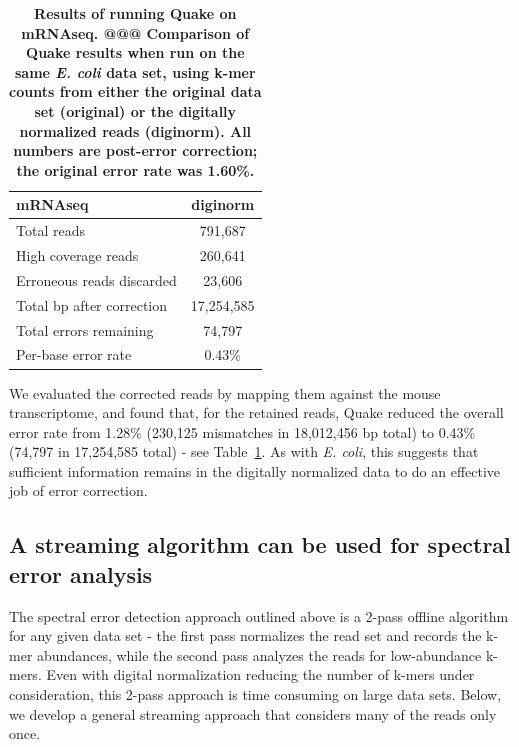 \documentclass{article}
\begin{document}
\begin{table}
\begin{tabular}{|l|c|}
\hline
{\bf mRNAseq}                    & diginorm \\
\hline
Total reads                      & 791,687 \\
High coverage reads              & 260,641 \\
Erroneous reads discarded        & 23,606 \\
Total bp after correction        & 17,254,585 \\
Total errors remaining           & 74,797 \\
Per-base error rate              & 0.43\% \\
\hline
\end{tabular}

\caption{{\bf Results of running Quake on mRNAseq. @@@ Comparison of Quake results when run on the same {\em
      E. coli} data set, using k-mer counts from either the original
    data set (original) or the digitally normalized reads
    (diginorm).  All numbers are post-error correction; the original
    error rate was 1.60\%.}}

\label{tab:quake_mrna}
\end{table}

We evaluated the corrected reads by mapping them against the mouse
transcriptome, and found that, for the retained reads, Quake reduced
the overall error rate from 1.28\% (230,125 mismatches in 18,012,456
bp total) to 0.43\% (74,797 in 17,254,585 total) - see
Table~\ref{tab:quake_mrna}.  As with {\em E. coli}, this suggests that
sufficient information remains in the digitally normalized data to do
an effective job of error correction.

\subsection{A streaming algorithm can be used for spectral error analysis}

The spectral error detection approach outlined above is a 2-pass
offline algorithm for any given data set - the first pass normalizes
the read set and records the k-mer abundances, while the second pass
analyzes the reads for low-abundance k-mers.  Even with digital
normalization reducing the number of k-mers under consideration, this
2-pass approach is time consuming on large data sets.  Below, we
develop a general streaming approach that considers many of the
reads only once.
\end{document}
